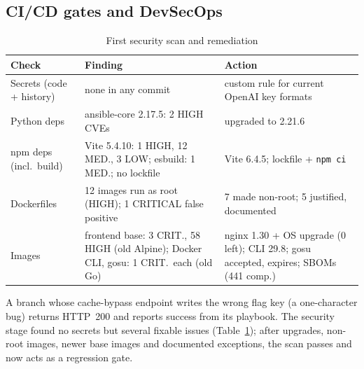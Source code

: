 

\subsection{CI/CD gates and DevSecOps}
\begin{table}[t]
\caption{First security scan and remediation}
\label{tab:security}
\centering
\scriptsize
\setlength{\tabcolsep}{3pt}
\begin{tabular}{@{}p{1.55cm}p{3.05cm}p{3.0cm}@{}}
\toprule
Check & Finding & Action \\
\midrule
Secrets (code + history) & none in any commit & custom rule for current OpenAI key formats \\
Python deps & ansible-core 2.17.5: 2 HIGH CVEs & upgraded to 2.21.6 \\
npm deps (incl.\ build) & Vite 5.4.10: 1 HIGH, 12 MED., 3 LOW; esbuild: 1 MED.; no lockfile & Vite 6.4.5; lockfile + \texttt{npm ci} \\
Dockerfiles & 12 images run as root (HIGH); 1 CRITICAL false positive & 7 made non-root; 5 justified, documented \\
Images & frontend base: 3 CRIT., 58 HIGH (old Alpine); Docker CLI, gosu: 1 CRIT.\ each (old Go) & nginx 1.30 + OS upgrade (0 left); CLI 29.8; gosu accepted, expires; SBOMs (441 comp.) \\
\bottomrule
\end{tabular}
\end{table}

A branch whose cache-bypass endpoint writes the wrong flag key (a one-character bug) returns HTTP~200
and reports success from its playbook. The security stage found no secrets but several fixable
issues (Table~\ref{tab:security}); after upgrades, non-root images, newer base images and documented
exceptions, the scan passes and now acts as a regression gate.

